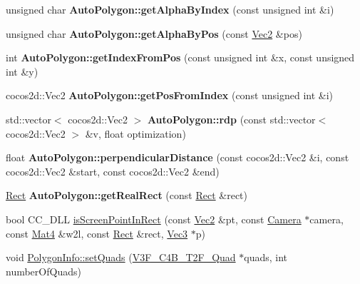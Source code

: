 \begin{DoxyCompactItemize}
\item 
\mbox{\label{group____2d_ga7bf48596553af5600a4020f117259894}} 
unsigned char {\bfseries Auto\+Polygon\+::get\+Alpha\+By\+Index} (const unsigned int \&i)
\item 
\mbox{\label{group____2d_ga94fbeedbd00cf4b73119eaca2a7029d2}} 
unsigned char {\bfseries Auto\+Polygon\+::get\+Alpha\+By\+Pos} (const \hyperlink{classVec2}{Vec2} \&pos)
\item 
\mbox{\label{group____2d_ga819aa1adb1c364a62cc09a6631fadf2e}} 
int {\bfseries Auto\+Polygon\+::get\+Index\+From\+Pos} (const unsigned int \&x, const unsigned int \&y)
\item 
\mbox{\label{group____2d_ga2929510d6fdad410105455327a0e95ae}} 
cocos2d\+::\+Vec2 {\bfseries Auto\+Polygon\+::get\+Pos\+From\+Index} (const unsigned int \&i)
\item 
\mbox{\label{group____2d_ga6046bd3ba1552bac9f5e334b82c57a41}} 
std\+::vector$<$ cocos2d\+::\+Vec2 $>$ {\bfseries Auto\+Polygon\+::rdp} (const std\+::vector$<$ cocos2d\+::\+Vec2 $>$ \&v, float optimization)
\item 
\mbox{\label{group____2d_gab3bf552fad7983845509c2fcd879c938}} 
float {\bfseries Auto\+Polygon\+::perpendicular\+Distance} (const cocos2d\+::\+Vec2 \&i, const cocos2d\+::\+Vec2 \&start, const cocos2d\+::\+Vec2 \&end)
\item 
\mbox{\label{group____2d_ga8cce31e647cd6a216252ad8e14f8ffce}} 
\hyperlink{classRect}{Rect} {\bfseries Auto\+Polygon\+::get\+Real\+Rect} (const \hyperlink{classRect}{Rect} \&rect)
\item 
bool C\+C\+\_\+\+D\+LL \hyperlink{group____2d_gac59eef974273313c2393f4098f2d8345}{is\+Screen\+Point\+In\+Rect} (const \hyperlink{classVec2}{Vec2} \&pt, const \hyperlink{classCamera}{Camera} $\ast$camera, const \hyperlink{classMat4}{Mat4} \&w2l, const \hyperlink{classRect}{Rect} \&rect, \hyperlink{classVec3}{Vec3} $\ast$p)
\item 
void \hyperlink{group____2d_ga6fcf67328cc769e665e5b70b9138d64d}{Polygon\+Info\+::set\+Quads} (\hyperlink{structV3F__C4B__T2F__Quad}{V3\+F\+\_\+\+C4\+B\+\_\+\+T2\+F\+\_\+\+Quad} $\ast$quads, int number\+Of\+Quads)

\end{DoxyCompactItemize}
